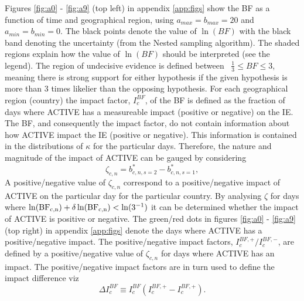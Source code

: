 \documentclass[fleqn,usenatbib,nofootinbib]{revtex4-2}
\begin{document}
	Figures \ref{fig:a0} - \ref{fig:a9} (top left) in appendix \ref{app:figs} show the BF as a function of time and geographical region, using $a_{max}=b_{max}=20$ and $a_{min}=b_{min}=0$. The black points denote the value of $\ln(BF)$ with the black band denoting the uncertainty (from the Nested sampling algorithm). The shaded regions explain how the value of $\ln(BF)$ should be interpreted (see the legend). The region of undecisive evidence is defined between~\citep{Jeffreys61} $\frac{1}{3}\leq BF \leq 3$, meaning there is strong support for either hypothesis if the given hypothesis is more than $3$ times likelier than the opposing hypothesis. For each geographical region (country) the impact factor, $I^{BF}_{c}$, of the BF is defined as the fraction of days where ACTIVE has a measureable impact (positive or negative) on the IE.	The BF, and consequently the impact factor, do not contain information about how ACTIVE impact the IE (positive or negative). This information is contained in the distributions of $\kappa$ for the particular days. Therefore, the nature and magnitude of the impact of ACTIVE can be gauged by considering
	\begin{equation}
		\zeta_{c,n} = b_{c,n,s=2}^*-b_{c,n,s=1}^*,
	\end{equation}
	A positive/negative value of $\zeta_{c,n}$ correspond to a positive/negative impact of ACTIVE on the particular day for the particular country. By analysing $\zeta$ for days where $\ln(\rm BF_{c,n})+\delta\ln(\rm BF_{c,n})<\ln(3^{-1})$ it can be determined whether the impact of ACTIVE is positive or negative. The green/red dots in figures \ref{fig:a0} - \ref{fig:a9} (top right) in appendix \ref{app:figs} denote the days where ACTIVE has a positive/negative impact. The positive/negative impact factors, $I^{BF,+}_c/I^{BF,-}_{c}$, are defined by a positive/negative value of $\zeta_{c,n}$ for days where ACTIVE has an impact. The positive/negative impact factors are in turn used to define the impact difference viz
	\begin{equation}
		\Delta I^{BF}_c\equiv I^{BF}_c(I^{BF,+}_c-I^{BF,+}_c).
	\end{equation}
\end{document}
